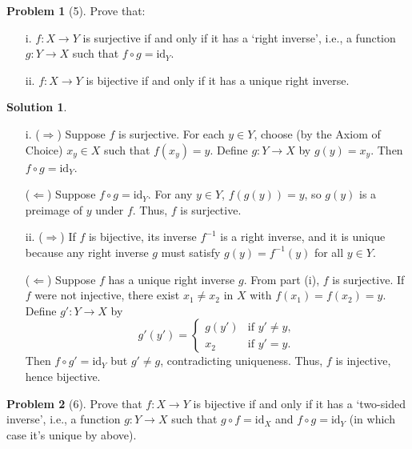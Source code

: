 \documentclass{article}
\theoremstyle{definition}
\newtheorem{problem}{Problem}
\newtheorem{solution}{Solution}
\begin{document}
\begin{problem}[5]
Prove that:
\begin{enumerate}
    \item[i.] $f : X \longrightarrow Y$ is surjective if and only if it has a ‘right inverse’, i.e., a function $g : Y \longrightarrow X$ such that $f \circ g = \text{id}_Y$.
    \item[ii.] $f : X \longrightarrow Y$ is bijective if and only if it has a unique right inverse.
\end{enumerate}
\end{problem}

\begin{solution}
\begin{enumerate}
    \item[i.] ($\Rightarrow$) Suppose $f$ is surjective. For each $y \in Y$, choose (by the Axiom of Choice) $x_y \in X$ such that $f(x_y) = y$. Define $g : Y \longrightarrow X$ by $g(y) = x_y$. Then $f \circ g = \text{id}_Y$.

    ($\Leftarrow$) Suppose $f \circ g = \text{id}_Y$. For any $y \in Y$, $f(g(y)) = y$, so $g(y)$ is a preimage of $y$ under $f$. Thus, $f$ is surjective.

    \item[ii.] ($\Rightarrow$) If $f$ is bijective, its inverse $f^{-1}$ is a right inverse, and it is unique because any right inverse $g$ must satisfy $g(y) = f^{-1}(y)$ for all $y \in Y$.

    ($\Leftarrow$) Suppose $f$ has a unique right inverse $g$. From part (i), $f$ is surjective. If $f$ were not injective, there exist $x_1 \neq x_2$ in $X$ with $f(x_1) = f(x_2) = y$. Define $g' : Y \longrightarrow X$ by
    \[
    g'(y') = 
    \begin{cases}
    g(y') & \text{if } y' \neq y, \\
    x_2 & \text{if } y' = y.
    \end{cases}
    \]
    Then $f \circ g' = \text{id}_Y$ but $g' \neq g$, contradicting uniqueness. Thus, $f$ is injective, hence bijective.
\end{enumerate}
\end{solution}

\begin{problem}[6]
Prove that $f : X \longrightarrow Y$ is bijective if and only if it has a ‘two-sided inverse’, i.e., a function $g : Y \longrightarrow X$ such that $g \circ f = \text{id}_X$ and $f \circ g = \text{id}_Y$ (in which case it's unique by above).
\end{problem}
\end{document}
